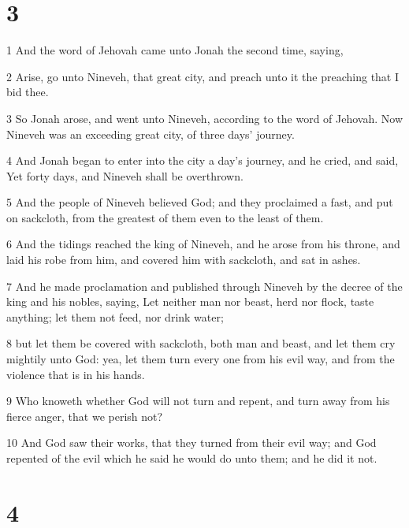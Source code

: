 \chapter{3}

\par 1 And the word of Jehovah came unto Jonah the second time, saying,
\par 2 Arise, go unto Nineveh, that great city, and preach unto it the preaching that I bid thee.
\par 3 So Jonah arose, and went unto Nineveh, according to the word of Jehovah. Now Nineveh was an exceeding great city, of three days' journey.
\par 4 And Jonah began to enter into the city a day's journey, and he cried, and said, Yet forty days, and Nineveh shall be overthrown.
\par 5 And the people of Nineveh believed God; and they proclaimed a fast, and put on sackcloth, from the greatest of them even to the least of them.
\par 6 And the tidings reached the king of Nineveh, and he arose from his throne, and laid his robe from him, and covered him with sackcloth, and sat in ashes.
\par 7 And he made proclamation and published through Nineveh by the decree of the king and his nobles, saying, Let neither man nor beast, herd nor flock, taste anything; let them not feed, nor drink water;
\par 8 but let them be covered with sackcloth, both man and beast, and let them cry mightily unto God: yea, let them turn every one from his evil way, and from the violence that is in his hands.
\par 9 Who knoweth whether God will not turn and repent, and turn away from his fierce anger, that we perish not?
\par 10 And God saw their works, that they turned from their evil way; and God repented of the evil which he said he would do unto them; and he did it not.

\chapter{4}

